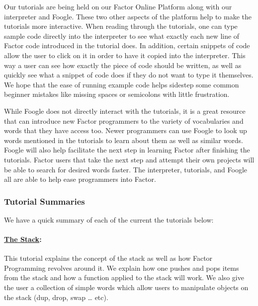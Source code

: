 \documentclass[
]{article}
\begin{document}
Our tutorials are being held on our Factor Online Platform along with
our interpreter and Foogle. These two other aspects of the platform help
to make the tutorials more interactive. When reading through the
tutorials, one can type sample code directly into the interpreter to see
what exactly each new line of Factor code introduced in the tutorial
does. In addition, certain snippets of code allow the user to click on
it in order to have it copied into the interpreter. This way a user can
see how exactly the piece of code should be written, as well as quickly
see what a snippet of code does if they do not want to type it
themselves. We hope that the ease of running example code helps sidestep
some common beginner mistakes like missing spaces or semicolons with
little frustration.

While Foogle does not directly interact with the tutorials, it is a
great resource that can introduce new Factor programmers to the variety
of vocabularies and words that they have access too. Newer programmers
can use Foogle to look up words mentioned in the tutorials to learn
about them as well as similar words. Foogle will also help facilitate
the next step in learning Factor after finishing the tutorials. Factor
users that take the next step and attempt their own projects will be
able to search for desired words faster. The interpreter, tutorials, and
Foogle all are able to help ease programmers into Factor.

\hypertarget{tutorial-summaries}{%
\subsubsection{Tutorial Summaries}\label{tutorial-summaries}}

We have a quick summary of each of the current the tutorials below:

\hypertarget{the-stack}{%
\paragraph{\texorpdfstring{\href{https://factor.netlify.app/book/the-stack.md}{The
Stack}:}{The Stack:}}\label{the-stack}}

This tutorial explains the concept of the stack as well as how Factor
Programming revolves around it. We explain how one pushes and pops items
from the stack and how a function applied to the stack will work. We
also give the user a collection of simple words which allow users to
manipulate objects on the stack (dup, drop, swap \ldots{} etc).
\end{document}
